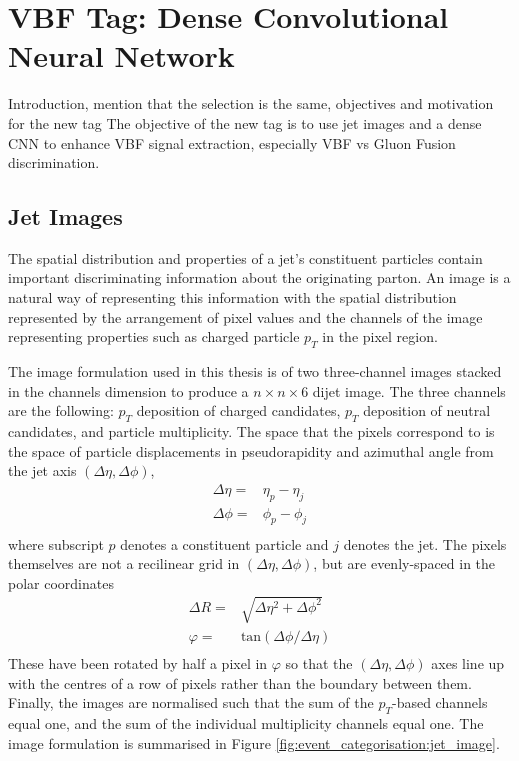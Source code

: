 \section{VBF Tag: Dense Convolutional Neural Network}
Introduction, mention that the selection is the same, objectives and motivation for the new tag
The objective of the new tag is to use jet images and a dense CNN to enhance VBF signal extraction, especially VBF vs Gluon Fusion discrimination. 


\subsection{Jet Images}
The spatial distribution and properties of a jet's constituent particles contain important discriminating information about the originating parton. 
An image is a natural way of representing this information with the spatial distribution represented by the arrangement of pixel values and the channels of the image representing properties such as charged particle $p_{T}$ in the pixel region.

The image formulation used in this thesis is of two three-channel images stacked in the channels dimension to produce a $n\times{}n\times{}6$ dijet image.
The three channels are the following: $p_T$ deposition of charged candidates, $p_T$ deposition of neutral candidates, and particle multiplicity.
The space that the pixels correspond to is the space of particle displacements in pseudorapidity and azimuthal angle from the jet axis $(\Delta\eta,\Delta\phi)$,
\begin{equation}
    \begin{split}
        \Delta\eta =& \eta_{p} - \eta_{j} \\ 
        \Delta\phi =& \phi_{p} - \phi_{j} \\
    \end{split}
    \label{eq:event_categorisation:pixel_coords}
\end{equation}
where subscript $p$ denotes a constituent particle and $j$ denotes the jet. 
The pixels themselves are not a recilinear grid in $(\Delta\eta,\Delta\phi)$, but are evenly-spaced in the polar coordinates 
\begin{equation}
    \begin{split}
        \Delta{R} =& \sqrt{\Delta\eta^2 + \Delta\phi^2} \\
        \varphi   =& \mathrm{tan}(\Delta\phi/\Delta\eta) \\
    \end{split}
    \label{eq:event_categorisation:pixel_coords}
\end{equation}
These have been rotated by half a pixel in $\varphi$ so that the $(\Delta\eta,\Delta\phi)$ axes line up with the centres of a row of pixels rather than the boundary between them. 
Finally, the images are normalised such that the sum of the $p_T$-based channels equal one, and the sum of the individual multiplicity channels equal one. 
The image formulation is summarised in Figure \ref{fig:event_categorisation:jet_image}.

